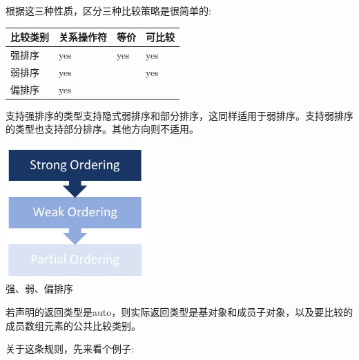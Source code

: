 根据这三种性质，区分三种比较策略是很简单的:

\begin{table}[H]
\centering
\begin{tabular}{llll}
比较类别 & 关系操作符 & 等价 & 可比较 \\ \hline
强排序     & yes                 & yes         & yes        \\
弱排序       & yes                 &             & yes        \\
偏排序    & yes                 &             &           
\end{tabular}
\end{table}

支持强排序的类型支持隐式弱排序和部分排序，这同样适用于弱排序。支持弱排序的类型也支持部分排序。其他方向则不适用。

\begin{center}
\includegraphics[width=0.4\textwidth]{content/3/chapter4/images/29.png}\\
强、弱、偏排序
\end{center}

若声明的返回类型是auto，则实际返回类型是基对象和成员子对象，以及要比较的成员数组元素的公共比较类别。

关于这条规则，先来看个例子:

